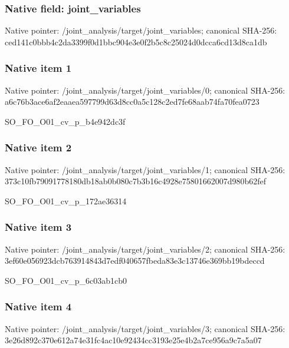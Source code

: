 \documentclass[10pt,a4paper]{article}
\begin{document}
\subsubsection{Native field: joint\_\allowbreak{}variables}
Native pointer: /joint\_\allowbreak{}analysis/target/joint\_\allowbreak{}variables; canonical SHA-256: ced141c0bbb4c2da3399f0d1bbc904e3e0f2b5c8c25024d0dcca6cd13d8ca1db

\subsubsection{Native item 1}
Native pointer: /joint\_\allowbreak{}analysis/target/joint\_\allowbreak{}variables/0; canonical SHA-256: a6c76b3ace6af2eaaea597799d63d8cc0a5c128c2ed7fe68aab74fa70fea0723

\begingroup\raggedright\sloppy SO\_\allowbreak{}FO\_\allowbreak{}O01\_\allowbreak{}cv\_\allowbreak{}p\_\allowbreak{}b4e942dc3f\par\endgroup

\subsubsection{Native item 2}
Native pointer: /joint\_\allowbreak{}analysis/target/joint\_\allowbreak{}variables/1; canonical SHA-256: 373c10fb79091778180db18ab0b080c7b3b16c4928e75801662007d980b62fef

\begingroup\raggedright\sloppy SO\_\allowbreak{}FO\_\allowbreak{}O01\_\allowbreak{}cv\_\allowbreak{}p\_\allowbreak{}172ae36314\par\endgroup

\subsubsection{Native item 3}
Native pointer: /joint\_\allowbreak{}analysis/target/joint\_\allowbreak{}variables/2; canonical SHA-256: 3ef60e056923dcb763914843d7edf040657fbeda83e3c13746e369bb19bdeccd

\begingroup\raggedright\sloppy SO\_\allowbreak{}FO\_\allowbreak{}O01\_\allowbreak{}cv\_\allowbreak{}p\_\allowbreak{}6c03ab1cb0\par\endgroup

\subsubsection{Native item 4}
Native pointer: /joint\_\allowbreak{}analysis/target/joint\_\allowbreak{}variables/3; canonical SHA-256: 3e26d892c370e612a74e31fc4ac10e92434cc3193e25e4b2a7ce956a9c7a5a07
\end{document}
